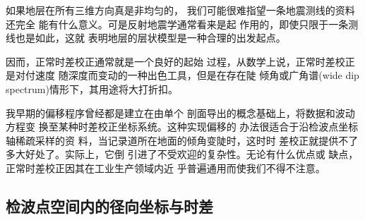 如果地层在所有三维方向真是非均匀的，
我们可能很难指望一条地震测线的资料还完全
能有什么意义。可是反射地震学通常看来是起
作用的，即使只限于一条测线也是如此，这就
表明地层的层状模型是一种合理的出发起点。

因而，正常时差校正通常就是一个良好的起始
过程，从数学上说，正常时差校正是对付速度
随深度而变动的一种出色工具，但是在存在陡
倾角或广角谱(wide dip spectrum)情形下，其用途将大打折扣。

我早期的偏移程序曾经都是建立在由单个
剖面导出的概念基础上，将数据和波动方程变
换至某种时差校正坐标系统。这种实现偏移的
办法很适合于沿检波点坐标轴稀疏采样的资
料，当记录道所在地面的倾角变陡时，这时时
差校正就提供不了多大好处了。实际上，它倒
引进了不受欢迎的复杂性。无论有什么优点或
缺点，正常时差校正因其在工业生产领域内近
乎普遍通用而使我们不得不注意。

\subsection{检波点空间内的径向坐标与时差}
\label{sec:5.7.3}


